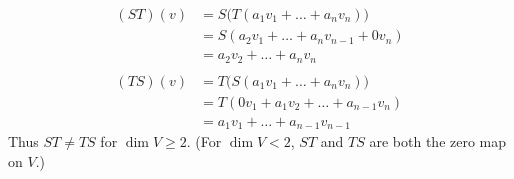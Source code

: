 \documentclass[a5paper]{article}
\begin{document}
\begin{align*}
    (ST)(v) &= S\big( T(a_1v_1 + \dots + a_nv_n) \big)              \\
            &= S ( a_2v_1 + \dots + a_nv_{n-1} + 0v_n )             \\
            &= a_2v_2 + \dots + a_nv_n                              \\
                                                                    \\
    (TS)(v) &= T\big( S(a_1v_1 + \dots + a_nv_n) \big)              \\
            &= T ( 0v_1 + a_1v_2 + \dots + a_{n-1}v_n )             \\
            &= a_1v_1 + \dots + a_{n-1}v_{n-1}
\end{align*}
Thus $ST \neq TS$ for $\dim V \ge 2$.
(For $\dim V < 2$, $ST$ and $TS$ are both the zero map on $V$.)
\end{document}

